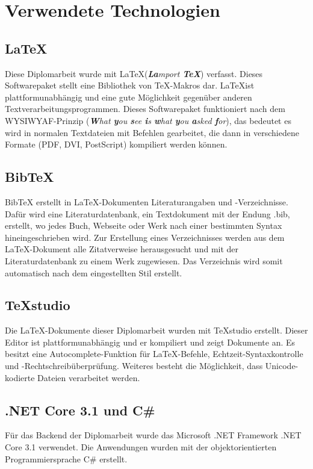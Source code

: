 \chapter{Verwendete Technologien} \label{technologien}

\section{\LaTeX}
Diese Diplomarbeit wurde mit \LaTeX \space (\textit{{\bf{\textit{La}}}mport {\bf{\textit{\TeX}}}}) verfasst. Dieses Softwarepaket stellt eine Bibliothek von \TeX-Makros dar. \LaTeX \space ist plattformunabhängig und eine gute Möglichkeit gegenüber anderen Textverarbeitungsprogrammen. Dieses Softwarepaket funktioniert nach dem WYSIWYAF-Prinzip (\textit{{\bf{W}}hat {\bf{y}}ou {\bf{s}}ee {\bf{i}}s {\bf{w}}hat {\bf{y}}ou {\bf{a}}sked {\bf{f}}or}), das bedeutet es wird in normalen Textdateien mit Befehlen gearbeitet, die dann in verschiedene Formate (PDF, DVI, PostScript) kompiliert werden können. \autocite{wikiLatex}

\section{BibTeX}
BibTeX erstellt in \LaTeX-Dokumenten Literaturangaben und -Verzeichnisse. Dafür wird eine Literaturdatenbank, ein Textdokument mit der Endung .bib, erstellt, wo jedes Buch, Webseite oder Werk nach einer bestimmten Syntax hineingeschrieben wird. Zur Erstellung eines Verzeichnisses werden aus dem \LaTeX-Dokument alle Zitatverweise herausgesucht und mit der Literaturdatenbank zu einem Werk zugewiesen. Das Verzeichnis wird somit automatisch nach dem eingestellten Stil erstellt. \autocite{wikiBibtex}

\section{TeXstudio}
Die \LaTeX-Dokumente dieser Diplomarbeit wurden mit TeXstudio erstellt. Dieser Editor ist plattformunabhängig und er kompiliert und zeigt Dokumente an. Es besitzt eine Autocomplete-Funktion für \LaTeX-Befehle, Echtzeit-Syntaxkontrolle und -Rechtschreibüberprüfung. Weiteres besteht die Möglichkeit, dass Unicode-kodierte Dateien verarbeitet werden. \autocite{wikiTexstudio}

\section{.NET Core 3.1 und C\#}
Für das Backend der Diplomarbeit wurde das Microsoft .NET Framework .NET Core 3.1 verwendet. Die Anwendungen wurden mit der objektorientierten Programmiersprache C\#  erstellt. \autocite{wikiDotnet}


